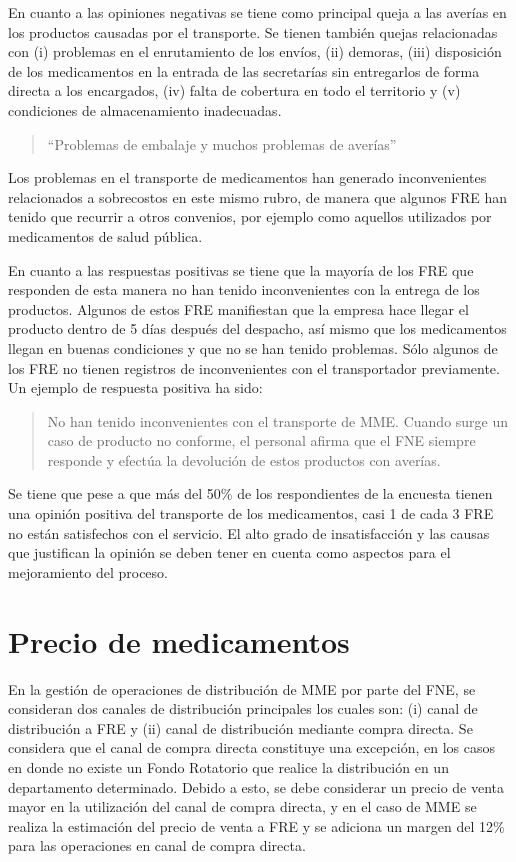 \documentclass[
]{book}
\begin{document}
En cuanto a las opiniones negativas se tiene como principal queja a las averías en los productos causadas por el transporte. Se tienen también quejas relacionadas con (i) problemas en el enrutamiento de los envíos, (ii) demoras, (iii) disposición de los medicamentos en la entrada de las secretarías sin entregarlos de forma directa a los encargados, (iv) falta de cobertura en todo el territorio y (v) condiciones de almacenamiento inadecuadas.

\begin{quote}
``Problemas de embalaje y muchos problemas de averías''
\end{quote}

Los problemas en el transporte de medicamentos han generado inconvenientes relacionados a sobrecostos en este mismo rubro, de manera que algunos FRE han tenido que recurrir a otros convenios, por ejemplo como aquellos utilizados por medicamentos de salud pública.

En cuanto a las respuestas positivas se tiene que la mayoría de los FRE que responden de esta manera no han tenido inconvenientes con la entrega de los productos. Algunos de estos FRE manifiestan que la empresa hace llegar el producto dentro de 5 días después del despacho, así mismo que los medicamentos llegan en buenas condiciones y que no se han tenido problemas. Sólo algunos de los FRE no tienen registros de inconvenientes con el transportador previamente. Un ejemplo de respuesta positiva ha sido:

\begin{quote}
No han tenido inconvenientes con el transporte de MME. Cuando surge un caso de producto no conforme, el personal afirma que el FNE siempre responde y efectúa la devolución de estos productos con averías.
\end{quote}

Se tiene que pese a que más del 50\% de los respondientes de la encuesta tienen una opinión positiva del transporte de los medicamentos, casi 1 de cada 3 FRE no están satisfechos con el servicio. El alto grado de insatisfacción y las causas que justifican la opinión se deben tener en cuenta como aspectos para el mejoramiento del proceso.

\hypertarget{precio-de-medicamentos}{%
\section{Precio de medicamentos}\label{precio-de-medicamentos}}

En la gestión de operaciones de distribución de MME por parte del FNE, se consideran dos canales de distribución principales los cuales son: (i) canal de distribución a FRE y (ii) canal de distribución mediante compra directa. Se considera que el canal de compra directa constituye una excepción, en los casos en donde no existe un Fondo Rotatorio que realice la distribución en un departamento determinado. Debido a esto, se debe considerar un precio de venta mayor en la utilización del canal de compra directa, y en el caso de MME se realiza la estimación del precio de venta a FRE y se adiciona un margen del 12\% para las operaciones en canal de compra directa.
\end{document}
